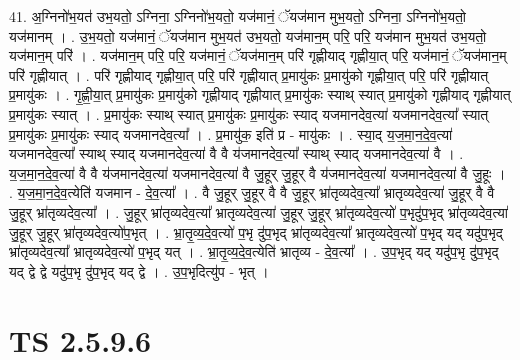 \documentclass[17pt]{extarticle}
\begin{document}
41. अ॒ग्निनो॑भ॒यत॑ उभ॒यतो॒ ऽग्निना॒ ऽग्निनो॑भ॒यतो॒ यज॑मानं॒ ॅयज॑मान मुभ॒यतो॒ ऽग्निना॒ ऽग्निनो॑भ॒यतो॒ यज॑मानम् । . उ॒भ॒यतो॒ यज॑मानं॒ ॅयज॑मान मुभ॒यत॑ उभ॒यतो॒ यज॑मान॒म् परि॒ परि॒ यज॑मान मुभ॒यत॑ उभ॒यतो॒ यज॑मान॒म् परि॑ । . यज॑मान॒म् परि॒ परि॒ यज॑मानं॒ ॅयज॑मान॒म् परि॑ गृह्णीयाद् गृह्णीया॒त् परि॒ यज॑मानं॒ ॅयज॑मान॒म् परि॑ गृह्णीयात् । . परि॑ गृह्णीयाद् गृह्णीया॒त् परि॒ परि॑ गृह्णीयात् प्र॒मायु॑कः प्र॒मायु॑को गृह्णीया॒त् परि॒ परि॑ गृह्णीयात् प्र॒मायु॑कः । . गृ॒ह्णी॒या॒त् प्र॒मायु॑कः प्र॒मायु॑को गृह्णीयाद् गृह्णीयात् प्र॒मायु॑कः स्याथ् स्यात् प्र॒मायु॑को गृह्णीयाद् गृह्णीयात् प्र॒मायु॑कः स्यात् । . प्र॒मायु॑कः स्याथ् स्यात् प्र॒मायु॑कः प्र॒मायु॑कः स्याद् यजमानदेव॒त्या॑ यजमानदेव॒त्या᳚ स्यात् प्र॒मायु॑कः प्र॒मायु॑कः स्याद् यजमानदेव॒त्या᳚ । . प्र॒मायु॑क॒ इति॑ प्र - मायु॑कः । . स्या॒द् य॒ज॒मा॒न॒दे॒व॒त्या॑ यजमानदेव॒त्या᳚ स्याथ् स्याद् यजमानदेव॒त्या॑ वै वै य॑जमानदेव॒त्या᳚ स्याथ् स्याद् यजमानदेव॒त्या॑ वै । . य॒ज॒मा॒न॒दे॒व॒त्या॑ वै वै य॑जमानदेव॒त्या॑ यजमानदेव॒त्या॑ वै जु॒हूर् जु॒हूर् वै य॑जमानदेव॒त्या॑ यजमानदेव॒त्या॑ वै जु॒हूः । . य॒ज॒मा॒न॒दे॒व॒त्येति॑ यजमान - दे॒व॒त्या᳚ । . वै जु॒हूर् जु॒हूर् वै वै जु॒हूर् भ्रा॑तृव्यदेव॒त्या᳚ भ्रातृव्यदेव॒त्या॑ जु॒हूर् वै वै जु॒हूर् भ्रा॑तृव्यदेव॒त्या᳚ । . जु॒हूर् भ्रा॑तृव्यदेव॒त्या᳚ भ्रातृव्यदेव॒त्या॑ जु॒हूर् जु॒हूर् भ्रा॑तृव्यदेव॒त्यो॑ प॒भृदु॑प॒भृद् भ्रा॑तृव्यदेव॒त्या॑ जु॒हूर् जु॒हूर् भ्रा॑तृव्यदेव॒त्यो॑प॒भृत् । . भ्रा॒तृ॒व्य॒दे॒व॒त्यो॑ प॒भृ दु॑प॒भृद् भ्रा॑तृव्यदेव॒त्या᳚ भ्रातृव्यदेव॒त्यो॑ प॒भृद् यद् यदु॑प॒भृद् भ्रा॑तृव्यदेव॒त्या᳚ भ्रातृव्यदेव॒त्यो॑ प॒भृद् यत् । . भ्रा॒तृ॒व्य॒दे॒व॒त्येति॑ भ्रातृव्य - दे॒व॒त्या᳚ । . उ॒प॒भृद् यद् यदु॑प॒भृ दु॑प॒भृद् यद् द्वे द्वे यदु॑प॒भृ दु॑प॒भृद् यद् द्वे । . उ॒प॒भृदित्यु॑प - भृत् । \newline
\pagebreak
{}

\section{ TS 2.5.9.6 }
\end{document}

